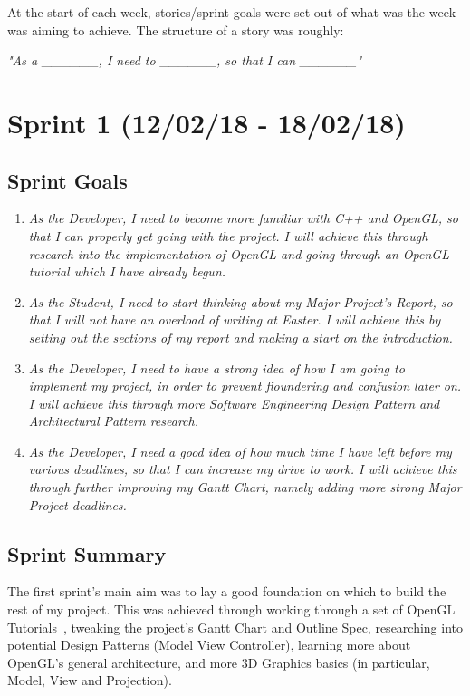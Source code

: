 \documentclass[a4paper,10pt]{report}
\begin{document}
At the start of each week, stories/sprint goals were set out of what was the week was aiming to achieve. The structure of a story was roughly:\medskip

\textit{"As a \_\_\_\_\_\_, I need to \_\_\_\_\_\_, so that I can \_\_\_\_\_\_"}

\section{Sprint 1 (12/02/18 - 18/02/18)}

\subsection{Sprint Goals}

\begin{enumerate}
  \item \textit{As the Developer, I need to become more familiar with C++ and OpenGL, so that I can properly get going with the project. I will achieve this through research into the implementation of OpenGL and going through an OpenGL tutorial which I have already begun.}
  
  \item \textit{As the Student, I need to start thinking about my Major Project's Report, so that I will not have an overload of writing at Easter. I will achieve this by setting out the sections of my report and making a start on the introduction.}
  \item \textit{As the Developer, I need to have a strong idea of how I am going to implement my project, in order to prevent floundering and confusion later on. I will achieve this through more Software Engineering Design Pattern and Architectural Pattern research. }
\item \textit{As the Developer, I need a good idea of how much time I have left before my various deadlines, so that I can increase my drive to work. I will achieve this through further improving my Gantt Chart, namely adding more strong Major Project deadlines. }

\end{enumerate}

\subsection{Sprint Summary}

The first sprint's main aim was to lay a good foundation on which to build the rest of my project. This was achieved through working through a set of OpenGL Tutorials~\cite{opengl_tutorial}, tweaking the project's Gantt Chart and Outline Spec, researching into potential Design Patterns (Model View Controller), learning more about OpenGL's general architecture, and more 3D Graphics basics (in particular, Model, View and Projection). \medskip
\end{document}

